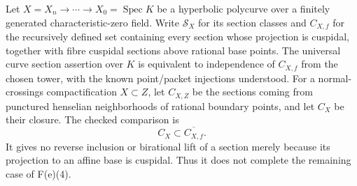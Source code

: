 \begin{proposition}
\label{F-inductive-cuspidality}
Let $X=X_n\to\cdots\to X_0=\operatorname{Spec}K$ be a
hyperbolic polycurve over a finitely generated characteristic-zero
field. Write $\mathcal S_X$ for its section classes and
$C_{X,f}$ for the recursively defined set containing every
section whose projection is cuspidal, together with fibre
cuspidal sections above rational base points. The universal
curve section assertion over $K$ is equivalent to independence
of $C_{X,f}$ from the chosen tower, with the known
point/packet injections understood. For a normal-crossings
compactification $X\subset Z$, let $C_{X,Z}$ be the sections
coming from punctured henselian neighborhoods of rational
boundary points, and let $C_X$ be their closure. The checked
comparison is
\[
 C_X\subset\overline{C_{X,f}}.
\]
It gives no reverse inclusion or birational lift of a section
merely because its projection to an affine base is cuspidal.
Thus it does not complete the remaining case of F(e)(4).
\end{proposition}
